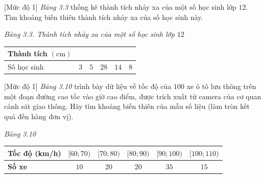 \begin{bt}%
[Mức độ 1]
	{\it Bảng 3.3} thống kê thành tích nhảy xa của một số học sinh lớp $12$. Tìm khoảng biến thiên thành tích nhảy xa của số học sinh này.
	\begin{center}
		{\it Bảng 3.3. Thành tích nhảy xa của một số học sinh lớp $12$}\\
		\begin{tabular}{|p{4cm}|p{2cm}|p{2cm}|p{2cm}|p{2cm}|p{2cm}|}
			\hline Thành tích $(\mathrm{cm})$&\centering\arraybackslash {$[150; 180)$} &\centering\arraybackslash {$[180; 210)$} &\centering\arraybackslash {$[210; 240)$} &\centering\arraybackslash {$[240; 270)$} &\centering\arraybackslash {$[270; 300)$} \\
			\hline Số học sinh &\centering\arraybackslash $3$ &\centering\arraybackslash $5$ &\centering\arraybackslash $28$ &\centering\arraybackslash $14$ &\centering\arraybackslash $8$ \\
			\hline
		\end{tabular}
	\end{center}
\end{bt}

\begin{bt}%
[Mức độ 1]
	\textit{Bảng 3.10} trình bày dữ liệu về tốc độ của $100$ xe ô tô lưu thông trên một đoạn đường cao tốc vào giờ cao điểm, được trích xuất từ camera của cơ quan cảnh sát giao thông. Hãy tìm khoảng biến thiên của mẫu số liệu (làm tròn kết quả đến hàng đơn vị).
	\begin{center}
		\textit{Bảng 3.10}\\
		\begin{tabular}{|l|c|c|c|c|c|}
			\hline  \textbf{Tốc độ (km/h)} & $[60 ; 70)$& $[70 ; 80)$ & $[80 ; 90)$ & $[90 ; 100)$ & $[100 ; 110)$ \\
			\hline \textbf{Số xe} & $10$ & $20$ & $20$ & $35$ & $15$ \\
			\hline
		\end{tabular}
	\end{center} 
\end{bt}

